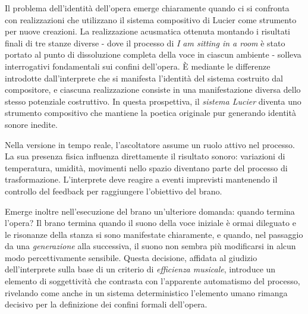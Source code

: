 Il problema dell'identità dell'opera emerge chiaramente quando ci si confronta con realizzazioni che utilizzano il sistema compositivo di Lucier come strumento per nuove creazioni. La realizzazione acusmatica ottenuta montando i risultati finali di tre stanze diverse - dove il processo di \textit{I am sitting in a room} è stato portato al punto di dissoluzione completa della voce in ciascun ambiente - solleva interrogativi fondamentali sui confini dell'opera. È mediante le differenze introdotte dall'interprete che si manifesta l'identità del sistema costruito dal compositore, e ciascuna realizzazione consiste in una manifestazione diversa dello stesso potenziale costruttivo. In questa prospettiva, il \textit{sistema Lucier} diventa uno strumento compositivo che mantiene la poetica originale pur generando identità sonore inedite.

Nella versione in tempo reale, l'ascoltatore assume un ruolo attivo nel processo. La sua presenza fisica influenza direttamente il risultato sonoro: variazioni di temperatura, umidità, movimenti nello spazio diventano parte del processo di trasformazione. L'interprete deve reagire a eventi imprevisti mantenendo il controllo del feedback per raggiungere l'obiettivo del brano.

Emerge inoltre nell'esecuzione del brano un'ulteriore domanda: quando termina l'opera? Il brano termina quando il suono della voce iniziale è ormai dileguato e le risonanze della stanza si sono manifestate chiaramente, e quando, nel passaggio da una \textit{generazione} alla successiva, il suono non sembra più modificarsi in alcun modo percettivamente sensibile. Questa decisione, affidata al giudizio dell'interprete sulla base di un criterio di \textit{efficienza musicale}, introduce un elemento di soggettività che contrasta con l'apparente automatismo del processo, rivelando come anche in un sistema deterministico l'elemento umano rimanga decisivo per la definizione dei confini formali dell'opera.